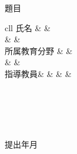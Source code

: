 \renewcommand{\maketitle}{\begin{titlepage}
\begin{center}

\fontsize{12pt}{0cm}\selectfont
\thispagestyle{empty}
\vspace*{1cm}

{\fontsize{24pt}{0cm}\selectfont\titletitle}

\vspace{2.5cm}
\end{center}

題目
\begin{center}
    {\fontsize{18pt}{0cm}\selectfont\thesistitle}
    \if{\englishtitle}{}
        {\fontsize{16pt}{0cm}\selectfont\englishtitle}
        \else
        \vspace{32pt}
    \fi
\end{center}

\vspace{3cm}

\bigskip

\newcommand{\authorinfo}{ %
\begin{center}
    \begin{table}[ht]
        \centering
        \begin{tabular}{cll}
        {氏名}     &  & \thesisauthor \\
                   &  & \\
        {所属教育分野} &  & \region \\
                   &  & \\
        {指導教員}&  & \teacherone
        \if{\teachertwo}{}{
                & & \\ \teachertwo}
        \fi
        \if{\teacherthree}{} {
                & & \\ \teachertwo}
        \fi
        \end{tabular}
        \end{table}
\end{center}
\if{\teachertwo}{}
    \\
\fi
\if{\teacherthree}{}
    \\
\fi
}

\authorinfo

\vspace{2cm}

\begin{center}
    \university\faculty\department \\
    \vspace{12pt}

    提出年月　　\submitdate
\end{center}
\end{titlepage}}
\maketitle
\restoregeometry
